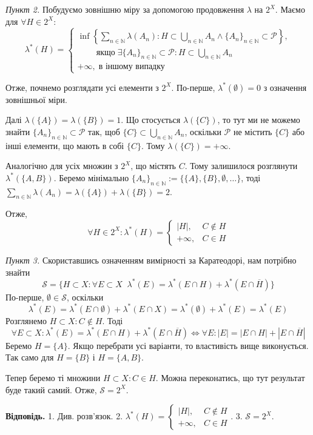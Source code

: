 \documentclass[14pt]{extarticle}
\begin{document}
\textit{Пункт 2.} Побудуємо зовнішню міру за допомогою продовження $\lambda$ на $2^X$. Маємо для $\forall H \in 2^X$:
\[
\lambda^*(H) = \begin{cases}
    \inf\left\{\sum_{n \in \mathbb{N}}\lambda(A_n): H \subset \bigcup_{n \in \mathbb{N}}A_n \wedge \{A_n\}_{n \in \mathbb{N}} \subset \mathcal{P}\right\}, \\ \;\;\;\;\;\;\;\;\text{якщо} \; \exists \{A_n\}_{n \in \mathbb{N}} \subset \mathcal{P}: H \subset \bigcup_{n \in\mathbb{N}}A_n \\ +\infty, \; \text{в іншому випадку}
\end{cases}
\]

Отже, почнемо розглядати усі елементи з $2^X$. По-перше, $\lambda^*(\emptyset) = 0$ з означення зовнішньої міри. 

Далі $\lambda(\{A\}) = \lambda(\{B\}) = 1$. Що стосується $\lambda(\{C\})$, то тут ми не можемо знайти $\{A_n\}_{n \in \mathbb{N}} \subset \mathcal{P}$ так, щоб $\{C\} \subset \bigcup_{n \in \mathbb{N}}A_n$, оскільки $\mathcal{P}$ не містить $\{C\}$ або інші елементи, що мають в собі $\{C\}$. Тому $\lambda(\{C\})=+\infty$. 

Аналогічно для усіх множин з $2^X$, що містять $C$. Тому залишилося розглянути $\lambda^*(\{A,B\})$. Беремо мінімально $\{A_n\}_{n \in \mathbb{N}} := \{\{A\},\{B\},\emptyset,\dots\}$, тоді $\sum_{n \in \mathbb{N}}\lambda(A_n) = \lambda(\{A\}) + \lambda(\{B\}) = 2$. 

Отже,
\[
\forall H \in 2^X: \lambda^*(H) = \begin{cases}
    |H|, & C \not \in H \\
    +\infty, & C \in H
\end{cases}
\]

\textit{Пункт 3.} Скориставшись означенням вимірності за Каратеодорі, нам потрібно знайти
\[
\mathcal{S} = \{H \subset X: \forall E \subset X \; \; \lambda^*(E) = \lambda^*(E \cap H) + \lambda^*(E \cap \overline{H})\}
\]
По-перше, $\emptyset \in \mathcal{S}$, оскільки
\[
\lambda^*(E) = \lambda^*(E \cap \emptyset) + \lambda^*(E \cap X) = \lambda^*(\emptyset) + \lambda^*(E) = \lambda^*(E)
\]
Розглянемо $H \subset X: C \not\in H$. Тоді
\[
\forall E \subset X: \lambda^*(E) = \lambda^*(E \cap H) + \lambda^*(E \cap \overline{H}) \iff \forall E: |E| = |E \cap H| + |E \cap \overline{H}|
\]
Беремо $H = \{A\}$. Якщо перебрати усі варіанти, то властивість вище виконується. Так само для $H=\{B\}$ і $H=\{A,B\}$. 

Тепер беремо ті множини $H \subset X: C \in H$. Можна переконатись, що тут результат буде такий самий. Отже, $\mathcal{S} = 2^X$.

\textbf{Відповідь.} 1. Див. розв'язок. 2. $\lambda^*(H) = \begin{cases}
    |H|, & C \not\in H \\
    +\infty, & C \in H
\end{cases}$. 3. $\mathcal{S} = 2^X$.
\end{document}
